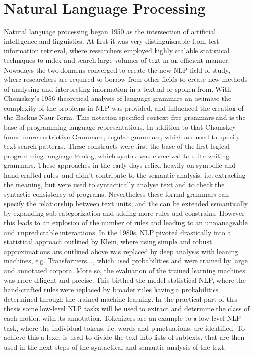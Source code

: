 \section{Natural Language Processing}
Natural language processing began 1950 as the intersection of artificial intelligence and linguistics. At first it was very distinguishable from test information retrieval, where researchers employed highly scalable statistical techniques to index and search large volumes of text in an efficient manner\cite{nadkarni2011natural}. Nowadays the two domains converged to create the new NLP field of study, where researchers are required to borrow from other fields to create new methods of analysing and interpreting information in a textual or spoken from.\newline
With Chomskey's 1956 theoretical analysis of language grammars an estimate the complexity of the problems in NLP was provided, and influenced the creation of the Backus-Naur Form. This notation specified context-free grammars and is the base of programming language representations. In addition to that Chomskey found more restrictive Grammars, regular grammars, which are used to specify text-search patterns\cite{nadkarni2011natural}. These constructs were first the base of the first logical programming language Prolog, which syntax was conceived to suite writing grammars.\newline
These approaches in the early days relied heavily on symbolic and hand-crafted rules, and didn't contribute to the semantic analysis, i.e. extracting the meaning, but were used to syntactically analyse text and to check the syntactic consistency of programs. Nevertheless these formal grammars can specify the relationship between text units, and the can be extended semantically by expanding sub-categorization and adding more rules and constrains. However this leads to an explosion of the number of rules and leading to an unmanageable and unpredictable interactions\cite{nadkarni2011natural}.\newline
In the 1980s, NLP pivoted drastically into a statistical approach outlined by Klein\cite{kleincs}, where using simple and robust approximations ans outlined above was replaced by deep analysis with leaning machines, e.g. Transformers..., which used probabilities and were trained by large and annotated corpora. More so, the evaluation of the trained learning machines was more diligent and precise\cite{nadkarni2011natural}. This birthed the model statistical NLP, where the hand-crafted rules were replaced by broader rules having a probabilities determined through the trained machine learning\cite{kleincs}. In the practical part of this thesis some low-level NLP tasks will be used to extract and determine the class of each motion with its annotation. Tokenizers are an example to a low-level NLP task, where the individual tokens, i.e. words and punctuations, are identified. To achieve this a lexer is used to divide the text into lists of subtexts, that are then used in the next steps of the syntactical and semantic analysis of the text.\newline
